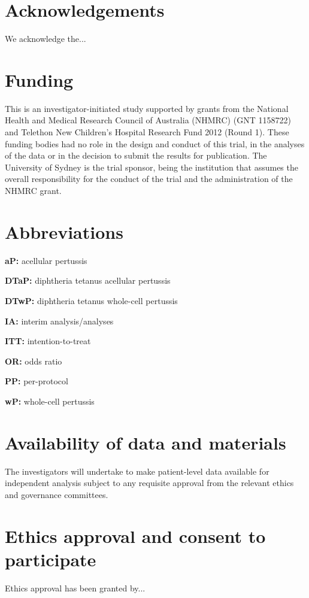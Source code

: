 \documentclass{bmcart}
\begin{document}
\begin{backmatter}

\section*{Acknowledgements}%
We acknowledge the...

\section*{Funding}%
This is an investigator-initiated study supported by grants from the National Health and Medical Research Council of Australia (NHMRC) (GNT 1158722) and Telethon New Children's Hospital Research Fund 2012 (Round 1).
These funding bodies had no role in the design and conduct of this trial, in the analyses of the data or in the decision to submit the results for publication.
The University of Sydney is the trial sponsor, being the institution that assumes the overall responsibility for the conduct of the trial and the administration of the NHMRC grant.

\section*{Abbreviations}%
\textbf{aP:} acellular pertussis

\textbf{DTaP:} diphtheria tetanus acellular pertussis 

\textbf{DTwP:} diphtheria tetanus whole-cell pertussis 

\textbf{IA:} interim analysis/analyses

\textbf{ITT:} intention-to-treat

\textbf{OR:} odds ratio

\textbf{PP:} per-protocol

\textbf{wP:} whole-cell pertussis

\section*{Availability of data and materials}%
The investigators will undertake to make patient-level data available for independent analysis subject to any requisite approval from the relevant ethics and governance committees.

\section*{Ethics approval and consent to participate}%
Ethics approval has been granted by...


\end{backmatter}
\end{document}
